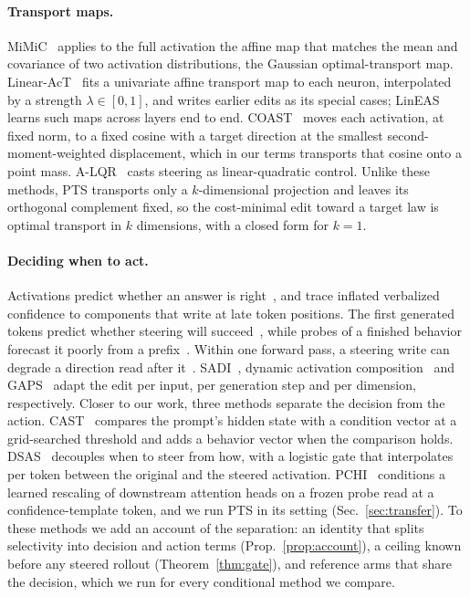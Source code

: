\documentclass{article}
\begin{document}
\paragraph{Transport maps.} MiMiC~\citep{singh2024mimic} applies to the full
activation the affine map that matches the mean and covariance of two
activation distributions, the Gaussian optimal-transport map.
Linear-AcT~\citep{rodriguez2025act} fits a univariate affine transport map to
each neuron, interpolated by a strength $\lambda\in[0,1]$, and writes earlier
edits as its special cases; LinEAS~\citep{rodriguez2025lineas} learns such maps
across layers end to end. COAST~\citep{nguyen2026coast} moves each activation,
at fixed norm, to a fixed cosine with a target direction at the smallest
second-moment-weighted displacement, which in our terms transports that cosine
onto a point mass. A-LQR~\citep{nguyen2026alqr} casts steering as
linear-quadratic control. Unlike these methods, PTS transports only a
$k$-dimensional projection and leaves its orthogonal complement fixed, so the
cost-minimal edit toward a target law is optimal transport in $k$ dimensions,
with a closed form for $k=1$.

\paragraph{Deciding when to act.} Activations predict whether an answer is
right~\citep{kadavath2022know,azaria2023lying}, and \citet{zhao2026wired} trace
inflated verbalized confidence to components that write at late token
positions. The first generated tokens predict whether steering will
succeed~\citep{steerable2026}, while probes of a finished behavior forecast it
poorly from a prefix~\citep{fpcg2026}. Within one forward pass, a steering
write can degrade a direction read after it~\citep{luo2026yopo}.
SADI~\citep{wang2025sadi}, dynamic activation
composition~\citep{scalena2024dynamic} and GAPS~\citep{gaps2026} adapt the edit
per input, per generation step and per dimension, respectively. Closer to our
work, three methods separate the decision from the action.
CAST~\citep{lee2024cast} compares the prompt's hidden state with a condition
vector at a grid-searched threshold and adds a behavior vector when the
comparison holds. DSAS~\citep{ferrando2026dsas} decouples when to steer from
how, with a logistic gate that interpolates per token between the original and the
steered activation. PCHI~\citep{liu2026probe} conditions a learned
rescaling of downstream attention heads on a frozen probe read at a
confidence-template token, and we run PTS in its setting
(Sec.~\ref{sec:transfer}). To these methods we add an account of the
separation: an identity
that splits selectivity into decision and action terms
(Prop.~\ref{prop:account}), a ceiling known before any steered rollout
(Theorem~\ref{thm:gate}), and reference arms that share the decision, which
we run for every conditional method we compare.
\end{document}
